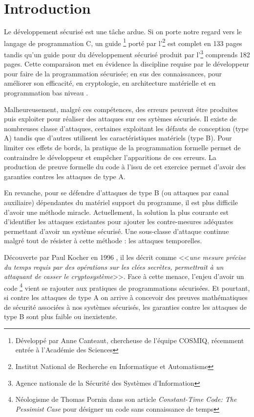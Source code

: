 \chapter*{Introduction}
\label{chap:introduction}

Le développement sécurisé est une tâche ardue. Si on porte notre regard vers le langage de programmation C, un guide \cite{progC_guide}\footnote{Développé par Anne Canteaut, chercheuse de l'équipe COSMIQ, récemment entrée à l'Académie des Sciences} porté par l'\footnote{Institut National de Recherche en Informatique et Automatisme} est complet en 133 pages tandis qu'un guide pour du développement sécurisé\cite{anssi_guideForSecureprogramming} produit par l'\footnote{Agence nationale de la Sécurité des Systèmes d'Information} comprends 182 pages. Cette comparaison met en évidence la discipline requise par le développeur pour faire de la programmation sécurisée; en sus des connaissances, pour améliorer son efficacité, en cryptologie, en architecture matérielle et en programmation bas niveau .\medbreak

Malheureusement, malgré ces compétences, des erreurs peuvent être produites puis exploiter pour réaliser des attaques sur ces sytèmes sécurisés. Il existe de nombreuses classe d'attaques, certaines exploitant les défauts de conception (type A) tandis que d'autres utilisent les caractéristiques matériels (type B). Pour limiter ces effets de bords, la pratique de la programmation formelle permet de contraindre le développeur et empêcher l'apparitions de ces erreurs. La production de preuve formelle du code à l'issu de cet exercice permet d'avoir des garanties contres les attaques de type A.

En revanche, pour se défendre d'attaques de type B (ou attaques par canal auxiliaire) dépendantes du matériel support du programme, il est plus difficile d'avoir une méthode miracle. Actuellement, la solution la plus courante est d'identifier les attaques existantes pour ajouter les contre-mesures adéquates permettant d'avoir un système sécurisé. Une sous-classe d'attaque continue malgré tout de résister à cette méthode : les attaques temporelles.\medbreak

Découverte par Paul Kocher en 1996 \cite{crypto-1996-1469}, il les décrit comme <<\textit{une mesure précise du temps requis par des opérations sur les clées secrètes, permettrait à un attaquant de casser le cryptosystème}>>. Face à cette menace, l'enjeu d'avoir un code \textit{}\footnote{Néologisme de Thomas Pornin dans son article \textit{Constant-Time Code: The Pessimist Case} \cite{constantTimePornin} pour désigner un code sans connaissance de temps} vient se rajouter aux pratiques de programmations sécurisées. Et pourtant, si contre les attaques de type A on arrive à concevoir des preuves mathématiques de sécurité associées à nos systèmes sécurisés, les garanties contre les attaques de type B sont plus faible ou inexistente.\medbreak


